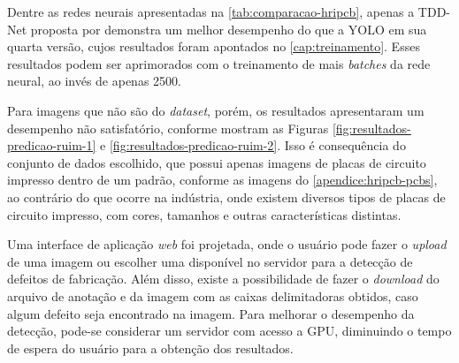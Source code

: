 Dentre as redes neurais apresentadas na \autoref{tab:comparacao-hripcb}, apenas a TDD-Net proposta por  demonstra um melhor desempenho do que a YOLO em sua quarta versão, cujos resultados foram apontados no \autoref{cap:treinamento}. Esses resultados podem ser aprimorados com o treinamento de mais \textit{batches} da rede neural, ao invés de apenas 2500.

Para imagens que não são do \textit{dataset}, porém, os resultados apresentaram um desempenho não satisfatório, conforme mostram as Figuras \ref{fig:resultados-predicao-ruim-1} e \ref{fig:resultados-predicao-ruim-2}. Isso é consequência do conjunto de dados escolhido, que possui apenas imagens de placas de circuito impresso dentro de um padrão, conforme as imagens do \autoref{apendice:hripcb-pcbs}, ao contrário do que ocorre na indústria, onde existem diversos tipos de placas de circuito impresso, com cores, tamanhos e outras características distintas.

Uma interface de aplicação \textit{web} foi projetada, onde o usuário pode fazer o \textit{upload} de uma imagem ou escolher uma disponível no servidor para a detecção de defeitos de fabricação. Além disso, existe a possibilidade de fazer o \textit{download} do arquivo de anotação e da imagem com as caixas delimitadoras obtidos, caso algum defeito seja encontrado na imagem. Para melhorar o desempenho da detecção, pode-se considerar um servidor com acesso a GPU, diminuindo o tempo de espera do usuário para a obtenção dos resultados.
